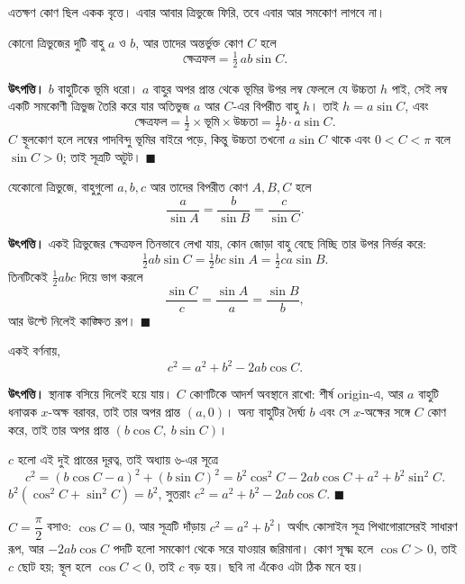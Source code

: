 \documentclass[11pt]{article}
\begin{document}
এতক্ষণ কোণ ছিল একক বৃত্তে। এবার আবার ত্রিভুজে ফিরি, তবে এবার আর সমকোণ লাগবে না।

\begin{idea}[ত্রিভুজের ক্ষেত্রফল]
কোনো ত্রিভুজের দুটি বাহু $a$ ও $b$, আর তাদের অন্তর্ভুক্ত কোণ $C$ হলে
\[
  \text{ক্ষেত্রফল} = \tfrac{1}{2}\, a b \sin C .
\]
\end{idea}

\noindent
\textbf{উৎপত্তি।} $b$ বাহুটিকে ভূমি ধরো। $a$ বাহুর অপর প্রান্ত থেকে ভূমির উপর
লম্ব ফেললে যে উচ্চতা $h$ পাই, সেই লম্ব একটি সমকোণী ত্রিভুজ তৈরি করে যার অতিভুজ
$a$ আর $C$-এর বিপরীত বাহু $h$। তাই $h = a \sin C$, এবং
\[
  \text{ক্ষেত্রফল} = \tfrac{1}{2} \times \text{ভূমি} \times \text{উচ্চতা}
  = \tfrac{1}{2} b \cdot a \sin C .
\]
$C$ স্থূলকোণ হলে লম্বের পাদবিন্দু ভূমির বাইরে পড়ে, কিন্তু উচ্চতা তখনো
$a \sin C$ থাকে এবং $0 < C < \pi$ বলে $\sin C > 0$; তাই সূত্রটি অটুট।
$\blacksquare$

\begin{idea}[সাইন সূত্র]
যেকোনো ত্রিভুজে, বাহুগুলো $a, b, c$ আর তাদের বিপরীত কোণ $A, B, C$ হলে
\[
  \frac{a}{\sin A} = \frac{b}{\sin B} = \frac{c}{\sin C} .
\]
\end{idea}

\noindent
\textbf{উৎপত্তি।} একই ত্রিভুজের ক্ষেত্রফল তিনভাবে লেখা যায়, কোন জোড়া বাহু
বেছে নিচ্ছি তার উপর নির্ভর করে:
\[
  \tfrac{1}{2} ab \sin C = \tfrac{1}{2} bc \sin A = \tfrac{1}{2} ca \sin B .
\]
তিনটিকেই $\tfrac{1}{2}abc$ দিয়ে ভাগ করলে
\[
  \frac{\sin C}{c} = \frac{\sin A}{a} = \frac{\sin B}{b} ,
\]
আর উল্টে নিলেই কাঙ্ক্ষিত রূপ। $\blacksquare$

\begin{idea}[কোসাইন সূত্র]
একই বর্ণনায়,
\[
  c^2 = a^2 + b^2 - 2ab\cos C .
\]
\end{idea}

\noindent
\textbf{উৎপত্তি।} স্থানাঙ্ক বসিয়ে দিলেই হয়ে যায়। $C$ কোণটিকে আদর্শ অবস্থানে
রাখো: শীর্ষ origin-এ, আর $a$ বাহুটি ধনাত্মক $x$-অক্ষ বরাবর, তাই তার অপর প্রান্ত
$(a, 0)$। অন্য বাহুটির দৈর্ঘ্য $b$ এবং সে $x$-অক্ষের সঙ্গে $C$ কোণ করে, তাই তার
অপর প্রান্ত $(b\cos C,\ b\sin C)$।

$c$ হলো এই দুই প্রান্তের দূরত্ব, তাই অধ্যায় ৬-এর সূত্রে
\[
  c^2 = (b\cos C - a)^2 + (b \sin C)^2
      = b^2\cos^2 C - 2ab\cos C + a^2 + b^2 \sin^2 C .
\]
$b^2(\cos^2 C + \sin^2 C) = b^2$, সুতরাং
$c^2 = a^2 + b^2 - 2ab\cos C$. $\blacksquare$

\begin{remark}
$C = \dfrac{\pi}{2}$ বসাও: $\cos C = 0$, আর সূত্রটি দাঁড়ায় $c^2 = a^2 + b^2$।
অর্থাৎ কোসাইন সূত্র পিথাগোরাসেরই সাধারণ রূপ, আর $-2ab\cos C$ পদটি হলো সমকোণ
থেকে সরে যাওয়ার জরিমানা। কোণ সূক্ষ্ম হলে $\cos C > 0$, তাই $c$ ছোট হয়; স্থূল
হলে $\cos C < 0$, তাই $c$ বড় হয়। ছবি না এঁকেও এটা ঠিক মনে হয়।
\end{remark}
\end{document}
